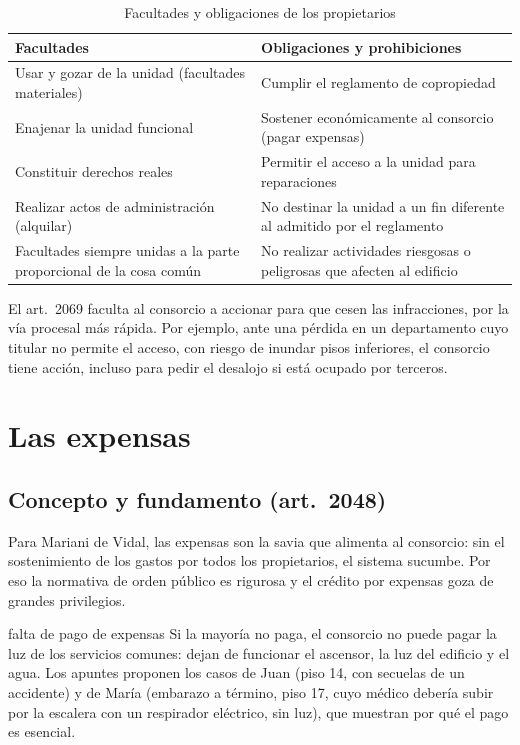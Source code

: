 \documentclass[12pt,oneside]{book}
\begin{document}
\begin{table}[H]
\centering
\small
\begin{tabularx}{\textwidth}{>{\raggedright\arraybackslash}X>{\raggedright\arraybackslash}X}
\toprule
\textbf{Facultades} & \textbf{Obligaciones y prohibiciones} \\
\midrule
Usar y gozar de la unidad (facultades materiales) & Cumplir el reglamento de copropiedad \\
Enajenar la unidad funcional & Sostener económicamente al consorcio (pagar expensas) \\
Constituir derechos reales & Permitir el acceso a la unidad para reparaciones \\
Realizar actos de administración (alquilar) & No destinar la unidad a un fin diferente al admitido por el reglamento \\
Facultades siempre unidas a la parte proporcional de la cosa común & No realizar actividades riesgosas o peligrosas que afecten al edificio \\
\bottomrule
\end{tabularx}
\caption{Facultades y obligaciones de los propietarios}
\end{table}

El art.~2069 faculta al consorcio a accionar para que cesen las infracciones, por la vía procesal más rápida. Por ejemplo, ante una pérdida en un departamento cuyo titular no permite el acceso, con riesgo de inundar pisos inferiores, el consorcio tiene acción, incluso para pedir el desalojo si está ocupado por terceros.

\section{Las expensas}

\subsection{Concepto y fundamento (art.~2048)}

Para Mariani de Vidal, las expensas son la savia que alimenta al consorcio: sin el sostenimiento de los gastos por todos los propietarios, el sistema sucumbe. Por eso la normativa de orden público es rigurosa y el crédito por expensas goza de grandes privilegios.

\begin{ejemplo}{falta de pago de expensas}
Si la mayoría no paga, el consorcio no puede pagar la luz de los servicios comunes: dejan de funcionar el ascensor, la luz del edificio y el agua. Los apuntes proponen los casos de Juan (piso 14, con secuelas de un accidente) y de María (embarazo a término, piso 17, cuyo médico debería subir por la escalera con un respirador eléctrico, sin luz), que muestran por qué el pago es esencial.
\end{ejemplo}
\end{document}
